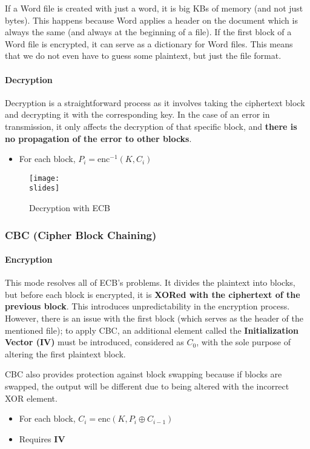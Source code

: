 If a Word file is created with just a word, it is big KBs of memory (and not just bytes). This happens because
Word applies a header on the document which is always the same (and always at the beginning of a file). If
the first block of a Word file is encrypted, it can serve as a dictionary for Word files. This means that we do not
even have to guess some plaintext, but just the file format.


\paragraph{Decryption}
Decryption is a straightforward process as it involves taking the ciphertext block and decrypting it with the corresponding key. In the case of an error in transmission, it only affects the decryption of that specific block, and \textbf{there is no propagation of the error to other blocks}.
\begin{itemize}
    \item For each block, $P_i = \text{enc}^{-1}(K, C_i)$
\end{itemize}
\begin{figure}[h]
    \centering
    \texttt{[image: \\slides]}
    \caption{Decryption with ECB}
\end{figure}


\subsubsection{CBC (Cipher Block Chaining)}

\paragraph{Encryption}
This mode resolves all of ECB's problems.
It divides the plaintext into blocks, but before each block is encrypted, it is \textbf{XORed with the ciphertext of the previous block}.
This introduces unpredictability in the encryption process.
However, there is an issue with the first block (which serves as the header of the mentioned file); to apply CBC, an additional element called the \textbf{Initialization Vector (IV)} must be introduced, considered as \(C_0\), with the sole purpose of altering the first plaintext block.

CBC also provides protection against block swapping because if blocks are swapped, the output will be different due to being altered with the incorrect XOR element.
\begin{itemize}
    \item For each block, $C_i = \text{enc}(K, P_i \oplus C_{i-1})$
    \item Requires \textbf{IV}
\end{itemize}


